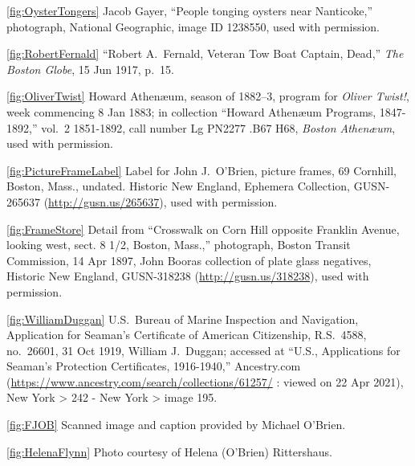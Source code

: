 \ref{fig:OysterTongers} Jacob Gayer, ``People tonging oysters near Nanticoke,'' photograph, National Geographic, image ID 1238550, used with permission.



\ref{fig:RobertFernald} ``Robert A.\ Fernald, Veteran Tow Boat Captain, Dead,'' \textit{The Boston Globe}, 15 Jun 1917, p.\ 15.

\ref{fig:OliverTwist}
Howard Athen\ae um, season of 1882--3, program for \textit{Oliver Twist!}, week commencing 8 Jan 1883; in collection ``Howard Athen\ae um Programs, 1847-1892,'' vol.\ 2 1851-1892, call number Lg PN2277 .B67 H68, \textit{Boston Athen\ae um}, used with permission.

\ref{fig:PictureFrameLabel} Label for John J.\ O'Brien, picture frames, 69 Cornhill, Boston, Mass., undated. Historic New England, Ephemera Collection, GUSN-265637 (\url{http://gusn.us/265637}), used with permission.

\ref{fig:FrameStore} Detail from ``Crosswalk on Corn Hill opposite Franklin Avenue, looking west, sect. 8 1/2, Boston, Mass.,'' photograph, Boston Transit Commission, 14 Apr 1897, John Booras collection of plate glass negatives, Historic New England, GUSN-318238 (\url{http://gusn.us/318238}), used with permission. 

\ref{fig:WilliamDuggan} U.S.\ Bureau of Marine Inspection and Navigation, Application for Seaman's Certificate of American Citizenship, R.S.\ 4588, no.\ 26601, 31 Oct 1919, William J.\ Duggan; accessed at ``U.S., Applications for Seaman's Protection Certificates, 1916-1940,'' Ancestry.com (\url{https://www.ancestry.com/search/collections/61257/} : viewed on 22 Apr 2021), New York > 242 - New York > image 195.

\ref{fig:FJOB} Scanned image and caption provided by Michael O'Brien.

\ref{fig:HelenaFlynn} Photo courtesy of Helena (O'Brien) Rittershaus.

